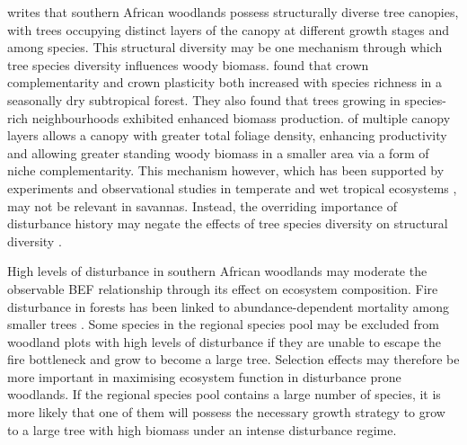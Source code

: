 \documentclass[11pt,a4paper]{article}
\begin{document}
\citet{Solbrig1996} writes that southern African woodlands possess structurally diverse tree canopies, with trees occupying distinct layers of the canopy at different growth stages and among species. This structural diversity may be one mechanism through which tree species diversity influences woody biomass. \citet{Kunz2019} found that crown complementarity and crown plasticity both increased with species richness in a seasonally dry subtropical forest. They also found that trees growing in species-rich neighbourhoods exhibited enhanced biomass production.  of multiple canopy layers allows a  canopy with  greater total foliage density, enhancing productivity and allowing greater standing woody biomass in a smaller area via a form of niche complementarity. This mechanism however, which has been supported by experiments and observational studies in temperate and wet tropical ecosystems \citep{Hardiman2011, Stark2012}, may not be relevant in savannas. Instead, the overriding importance of disturbance history may negate the effects of tree species diversity on structural diversity \citep{Grime2012}.

High levels of disturbance in southern African woodlands may moderate the observable BEF relationship through its effect on ecosystem composition. Fire disturbance in forests has been linked to abundance-dependent mortality among smaller trees \citep{Roques2001, Staver2009, Bond2005}. Some species in the regional species pool may be excluded from woodland plots with high levels of disturbance if they are unable to escape the fire bottleneck and grow to become a large tree. Selection effects may therefore be more important in maximising ecosystem function in disturbance prone woodlands. If the regional species pool contains a large number of species, it is more likely that one of them will possess the necessary growth strategy to grow to a large tree with high biomass under an intense disturbance regime. 
\end{document}
